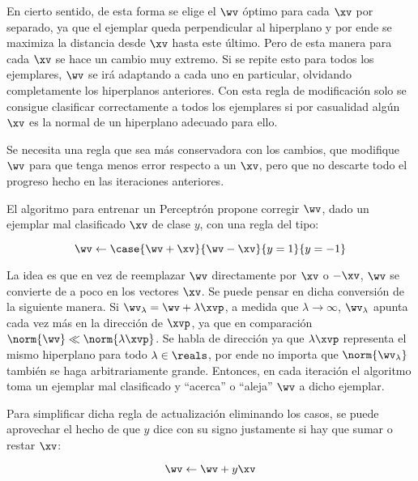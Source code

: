 
En cierto sentido, de esta forma se elige el $\wv$ óptimo para cada $\xv$ por separado, ya que el ejemplar queda perpendicular al hiperplano y por ende se maximiza la distancia desde $\xv$ hasta este último. Pero de esta manera para cada $\xv$ se hace un cambio muy extremo. Si se repite esto para todos los ejemplares, $\wv$ se irá adaptando a cada uno en particular, olvidando completamente los hiperplanos anteriores. Con esta regla de modificación solo se consigue clasificar correctamente a todos los ejemplares si por casualidad algún $\xv$ es la normal de un hiperplano adecuado para ello.

Se necesita una regla que sea más conservadora con los cambios, que modifique $\wv$ para que tenga menos error respecto a un $\xv$, pero que no descarte todo el progreso hecho en las iteraciones anteriores.

El algoritmo para entrenar un Perceptrón propone corregir $\wv$, dado un ejemplar mal clasificado $\xv$ de clase $y$, con una regla del tipo:

\begin{equation}
\wv \leftarrow \case{\wv+\xv}{\wv-\xv}{ y=1}{y=-1}
\end{equation}

La idea es que en vez de reemplazar $\wv$ directamente por $\xv$ o $-\xv$, $\wv$ se convierte de a poco en los vectores $\xv$. Se puede pensar en dicha conversión de la siguiente manera. Si $\wv_{\lambda}= \wv + \lambda \xvp$, a medida que $\lambda \rightarrow \infty$, $\wv_{\lambda}$ apunta cada vez más en la dirección de $\xvp$, ya que en comparación $ \norm{\wv} \ll \norm{\lambda \xvp}$. Se habla de dirección ya que $\lambda \xvp$ representa el mismo hiperplano para todo $\lambda \in \reals$, por ende no importa que $\norm{\wv_{\lambda}}$ también se haga arbitrariamente grande. Entonces, en cada iteración el algoritmo toma un ejemplar mal clasificado y ``acerca'' o ``aleja'' $\wv$ a dicho ejemplar.
 
Para simplificar dicha regla de actualización eliminando los casos, se puede aprovechar el hecho de que $y$ dice con su signo justamente si hay que sumar o restar $\xv$:

\begin{equation}
\wv \leftarrow \wv + y \xv
\end{equation}

